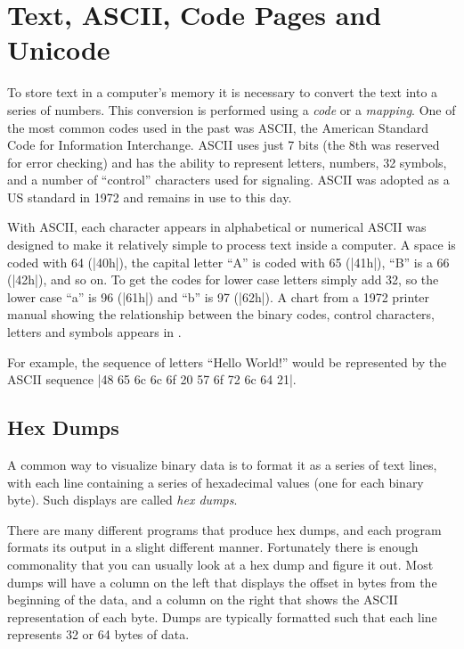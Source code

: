 \section{Text, ASCII, Code Pages and Unicode}\label{sec:letters}

To store text in a computer's memory it is necessary to convert the
text into a series of numbers. This conversion is performed using a 
\emph{code} or a \emph{mapping}. One of the most common codes used in
the past was ASCII, the American Standard Code for Information
Interchange. ASCII uses just 7 bits (the 8th was reserved for error
checking) and has the ability to represent letters, numbers, 32
symbols, and a number of ``control'' characters used for
signaling. ASCII was adopted as a US standard in 1972 and remains in
use to this day.

With ASCII, each character appears in alphabetical or numerical ASCII
was designed to make it relatively simple to process text inside a
computer. A space is coded with 64 (|40h|), the capital letter ``A''
is coded with 65 (|41h|), ``B'' is a 66 (|42h|), and so on. To get the
codes for lower case letters simply add 32, so the lower case ``a'' is
96 (|61h|) and ``b'' is 97 (|62h|).  A chart from a 1972 printer
manual showing the relationship between the binary codes, control
characters, letters and symbols appears in .



For example, the sequence of letters ``Hello World!'' would be
represented by the ASCII sequence |48 65 6c 6c 6f 20 57 6f 72 6c 64 21|.

\subsection{Hex Dumps}\label{sec:hex-dumps}
A common way to visualize binary data is to format it as a series of
text lines, with each line containing a series of hexadecimal values (one
for each binary byte). Such displays are called \emph{hex
  dumps}.

There are many different programs that produce hex dumps, and each
program formats its output in a slight different manner. Fortunately
there is enough commonality that you can usually look at a hex dump
and figure it out. Most dumps will have a column on the left that
displays the offset in bytes from the beginning of the data, and a
column on the right that shows the ASCII representation of each
byte. Dumps are typically formatted such that each line represents 32
or 64 bytes of data.

